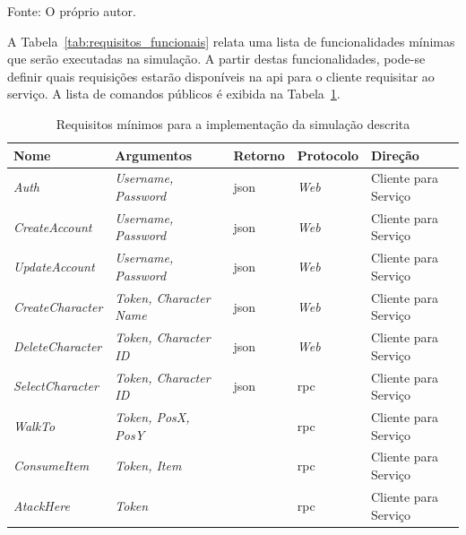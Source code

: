 \begin{table}[htb!]
\begin{adjustbox}{max width=\textwidth}
\begin{tabular}{|l|l|l|}
\end{tabular}
\end{adjustbox}

Fonte: O próprio autor.
\end{table}

A Tabela~\ref{tab:requisitos_funcionais} relata uma lista de funcionalidades mínimas que serão executadas na simulação.
%
A partir destas funcionalidades, pode-se definir quais requisições estarão disponíveis na \ac{api} para o cliente requisitar ao serviço.
%
A lista de comandos públicos é exibida na Tabela~\ref{tab:api_publica}.


\begin{table}[htb!]
\centering
\begin{adjustbox}{max width=\textwidth}
\caption{Requisitos mínimos para a implementação da simulação descrita}
\label{tab:api_publica}
\begin{tabular}{|l|l|l|l|l|}
\hline
Nome                  & Argumentos            & Retorno & Protocolo & Direção              \\ \hline
\textit{Auth}                  & \textit{Username, Password}    & \ac{json} & \textit{Web}       & Cliente para Serviço \\ \hline
\textit{CreateAccount}         & \textit{Username, Password}    & \ac{json} & \textit{Web}       & Cliente para Serviço \\ \hline
\textit{UpdateAccount}         & \textit{Username, Password}    & \ac{json} & \textit{Web}       & Cliente para Serviço \\ \hline
\textit{CreateCharacter}       & \textit{Token, Character Name} & \ac{json} & \textit{Web}       & Cliente para Serviço \\ \hline
\textit{DeleteCharacter}       & \textit{Token, Character ID}   & \ac{json} & \textit{Web}       & Cliente para Serviço \\ \hline
\textit{SelectCharacter}       & \textit{Token, Character ID}   & \ac{json} & \ac{rpc}           & Cliente para Serviço \\ \hline
\textit{WalkTo}                & \textit{Token, PosX, PosY}     &           & \ac{rpc}           & Cliente para Serviço \\ \hline
\textit{ConsumeItem}           & \textit{Token, Item}           &           & \ac{rpc}           & Cliente para Serviço \\ \hline
\textit{AtackHere}             & \textit{Token}                 &           & \ac{rpc}           & Cliente para Serviço \\ \hline

\end{tabular}
\end{adjustbox}
\end{table}
